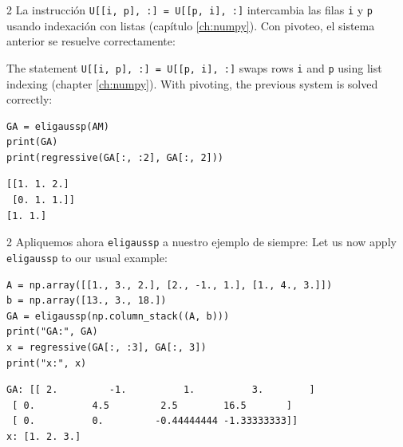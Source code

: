 \begin{paracol}{2}
La instrucción \texttt{U[[i, p], :] = U[[p, i], :]} intercambia las filas \texttt{i} y \texttt{p} usando indexación con listas (capítulo \ref{ch:numpy}). Con pivoteo, el sistema anterior se resuelve correctamente:

\switchcolumn
The statement \texttt{U[[i, p], :] = U[[p, i], :]} swaps rows \texttt{i} and \texttt{p} using list indexing (chapter \ref{ch:numpy}). With pivoting, the previous system is solved correctly:
\end{paracol}
\begin{verbatim}
GA = eligaussp(AM)
print(GA)
print(regressive(GA[:, :2], GA[:, 2]))
\end{verbatim}
\begin{verbatim}
[[1. 1. 2.]
 [0. 1. 1.]]
[1. 1.]
\end{verbatim}

\begin{paracol}{2}
Apliquemos ahora \texttt{eligaussp} a nuestro ejemplo de siempre:
\switchcolumn
Let us now apply \texttt{eligaussp} to our usual example:
\end{paracol}

\begin{verbatim}
A = np.array([[1., 3., 2.], [2., -1., 1.], [1., 4., 3.]])
b = np.array([13., 3., 18.])
GA = eligaussp(np.column_stack((A, b)))
print("GA:", GA)
x = regressive(GA[:, :3], GA[:, 3])
print("x:", x)
\end{verbatim}

\begin{verbatim}
GA: [[ 2.         -1.          1.          3.        ]
 [ 0.          4.5         2.5        16.5       ]
 [ 0.          0.         -0.44444444 -1.33333333]]
x: [1. 2. 3.]
\end{verbatim}

